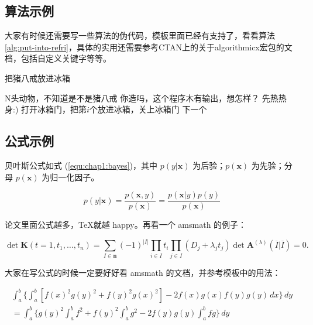 \subsection{算法示例}

大家有时候还需要写一些算法的伪代码，模板里面已经有支持了，看看算法\ref{alg:put-into-refri}，具体的实用还需要参考CTAN上的关于{\textsf{algorithmicx}}宏包的文档，包括自定义关键字等等。

\begin{algorithm}
\caption{把猪八戒放进冰箱}
\label{alg:put-into-refri}
\begin{algorithmic}[1]
\Require N头动物，不知道是不是猪八戒   
\Ensure 你造吗，这个程序木有输出，想怎样？
\State 先热热身:)
 
	\State 打开冰箱门，把第$i$个放进冰箱，关上冰箱门
\Else 
	\State 下一个
\EndIf
\EndFor
\end{algorithmic}
\end{algorithm}

\subsection{公式示例}

贝叶斯公式如式 (\ref{equ:chap1:bayes})，其中 $p(y|\mathbf{x})$ 为后验；$p(\mathbf{x})$ 为先验；分母 $p(\mathbf{x})$ 为归一化因子。

\begin{equation}
\label{equ:chap1:bayes}
p(y|\mathbf{x}) = \frac{p(\mathbf{x},y)}{p(\mathbf{x})}=
\frac{p(\mathbf{x}|y)p(y)}{p(\mathbf{x})} 
\end{equation}

论文里面公式越多，\TeX 就越 happy。再看一个 \textsf{amsmath} 的例子：

\newcommand{\envert}[1]{\left\lvert#1\right\rvert} 

\begin{equation}\label{detK2}
\det\mathbf{K}(t=1,t_1,\dots,t_n)=\sum_{I\in\mathbf{n}}(-1)^{\envert{I}}
\prod_{i\in I}t_i\prod_{j\in I}(D_j+\lambda_jt_j)\det\mathbf{A}
^{(\lambda)}(\overline{I}|\overline{I})=0.
\end{equation} 

大家在写公式的时候一定要好好看 \textsf{amsmath} 的文档，并参考模板中的用法：

\begin{multline*}\tag{[b]} %
\int_a^b\biggl\{\int_a^b[f(x)^2g(y)^2+f(y)^2g(x)^2]
 -2f(x)g(x)f(y)g(y)\,dx\biggr\}\,dy \\
 =\int_a^b\biggl\{g(y)^2\int_a^bf^2+f(y)^2
  \int_a^b g^2-2f(y)g(y)\int_a^b fg\biggr\}\,dy
\end{multline*}

